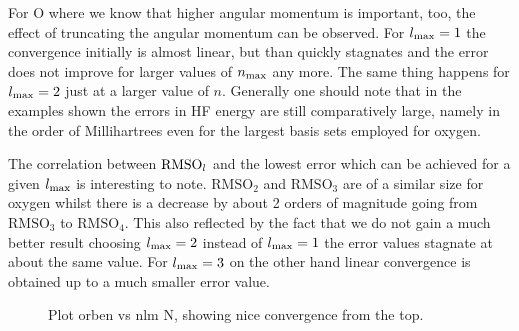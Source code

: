 For O where we know that higher angular momentum is important, too,
the effect of truncating the angular momentum can be observed.
For $l_\text{max} = 1$ the convergence initially is almost linear,
but than quickly stagnates and the error does not improve for larger
values of $n_\text{max}$ any more. The same thing happens for
$l_\text{max} = 2$ just at a larger value of $n$.
Generally one should note that in the examples shown
the errors in HF energy are still comparatively large,
namely in the order of Millihartrees even for the largest
basis sets employed for oxygen.

The correlation between $\text{RMSO}_l$ and the lowest error which can be
achieved for a given $l_\text{max}$ is interesting to note.
$\text{RMSO}_2$ and $\text{RMSO}_3$ are of a similar size for oxygen
whilst there is a decrease by about 2 orders of magnitude going
from $\text{RMSO}_3$ to $\text{RMSO}_4$.
This also reflected by the fact that we do not gain a much better
result choosing $l_\text{max} = 2$ instead of $l_\text{max} = 1$
the error values stagnate at about the same value.
For $l_\text{max} = 3$ on the other hand linear convergence is obtained
up to a much smaller error value.

\begin{figure}
	\centering
	\caption{Plot orben vs nlm N, showing nice convergence from the top.}
	\label{fig:OrbenNlmN}
\end{figure}


